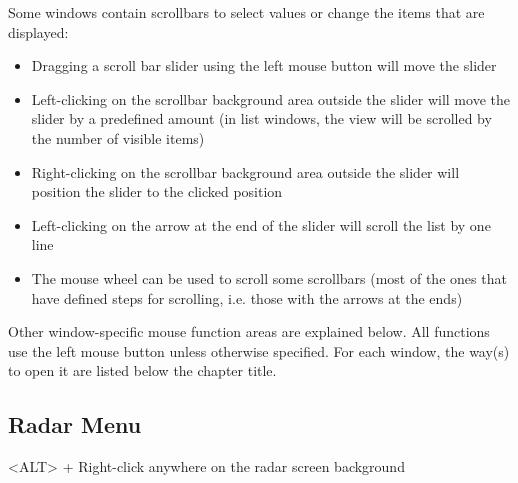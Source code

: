 \documentclass[a4paper,oneside,11pt]{memoir}
\begin{document}
\bigskip

Some windows contain scrollbars to select values or change the items that are displayed:

\bigskip

\begin{itemize}
    \item Dragging a scroll bar slider using the left mouse button will move the slider
    \item Left-clicking on the scrollbar background area outside the slider will move the slider by a predefined amount (in list windows, the view will be scrolled by the number of visible items)
    \item Right-clicking on the scrollbar background area outside the slider will position the slider to the clicked position
    \item Left-clicking on the arrow at the end of the slider will scroll the list by one line
    \item The mouse wheel can be used to scroll some scrollbars (most of the ones that have defined steps for scrolling, i.e. those with the arrows at the ends)
\end{itemize}

\bigskip

Other window-specific mouse function areas are explained below. All functions use the left mouse button unless otherwise specified. For each window, the way(s) to open it are listed below the chapter title.

\subsection{Radar Menu}
\label{menu:radarm}

<ALT> + Right-click anywhere on the radar screen background

\end{document}
